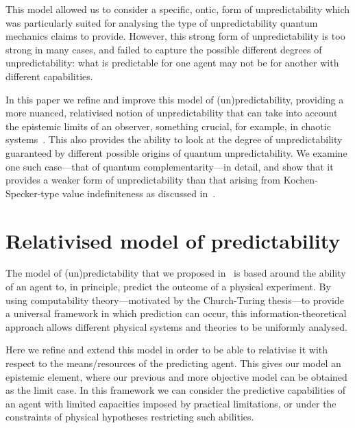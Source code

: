 \documentclass[information,article,submit,moreauthors,pdftex,12pt,a4paper]{mdpi}
\theoremstyle{mdpi}
\newcounter{ex}
\newcounter{re}
\theoremstyle{mdpidefinition}
\begin{document}


This model allowed us to consider a specific, ontic, form of unpredictability which was particularly suited for analysing the type of unpredictability quantum mechanics claims to provide.
However, this strong form of unpredictability is too strong in many cases, and failed to capture the possible different degrees of unpredictability: what is predictable for one agent may not be for another with different capabilities.

In this paper we refine and improve this model of (un)predictability, providing a more nuanced, relativised notion of unpredictability that can take into account the epistemic limits of an observer, something crucial, for example, in chaotic systems~\cite{Werndl:2009nx}.
This also provides the ability to look at the degree of unpredictability guaranteed by different possible origins of quantum unpredictability.
We examine one such case---that of quantum complementarity---in detail, and show that it provides a weaker form of unpredictability than that arising from Kochen-Specker-type value indefiniteness as discussed in~\cite{DBLP:conf/birthday/AbbottCS15}.


\section{Relativised model of predictability}

The model of (un)predictability that we proposed in~\cite{DBLP:conf/birthday/AbbottCS15} is based around the ability of an agent to, in principle, predict the outcome of a physical experiment.
By using computability theory---motivated by the Church-Turing thesis---to provide a universal framework in which prediction can occur, this information-theoretical approach allows different physical systems and theories to be uniformly analysed.

Here we refine and extend this model in order to be able to relativise it with respect to the means/resources  of the predicting agent.
This gives our model an epistemic element, where our previous and more objective model can be obtained as the limit case.
In this framework we can consider the predictive capabilities of an agent with limited capacities imposed by practical limitations, or under the constraints of physical hypotheses restricting such abilities.
\end{document}
